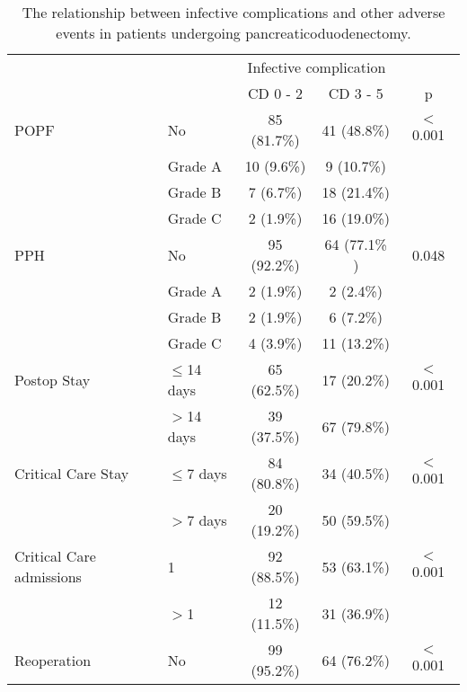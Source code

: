 \begin{table}[p]
	\centering
	\caption{The relationship between infective complications and other adverse events in patients undergoing pancreaticoduodenectomy.}
	\label{table:crp_comp_infect_vs_other_complications}
	\renewcommand{\arraystretch}{1.5} %
	\setlength{\tabcolsep}{9pt} %
	\begin{tabular}{|l l c c c|}
		\hline
		                         &               & \multicolumn{2}{c}{Infective complication} & \\
		                         &               & CD 0 - 2     & CD 3 - 5     & p              \\ \hline
		POPF                     & No            & 85 (81.7\%)  & 41 (48.8\%)  & $<$0.001       \\
		                         & Grade A       & 10 (9.6\%)   & 9 (10.7\%)   &  \\
		                         & Grade B       & 7 (6.7\%)    & 18 (21.4\%)  &  \\
		                         & Grade C       & 2 (1.9\%)    & 16 (19.0\%)  &  \\
		PPH                      & No            & 95 (92.2\%)  & 64 (77.1\% ) & 0.048          \\
		                         & Grade A       & 2 (1.9\%)    & 2 (2.4\%)    &  \\
		                         & Grade B       & 2 (1.9\%)    & 6 (7.2\%)    &  \\
		                         & Grade C       & 4  (3.9\%)   & 11 (13.2\%)  &  \\
		Postop Stay              & $\leq$14 days & 65 (62.5\%)  & 17 (20.2\%)  & $<$0.001       \\
		                         & $>$14 days    & 39 (37.5\%)  & 67 (79.8\%)  &  \\
		Critical Care Stay       & $\leq$7 days  & 84 (80.8\%)  & 34 (40.5\%)  & $<$0.001       \\
		                         & $>$7 days     & 20 (19.2\%)  & 50 (59.5\%)  &  \\
		Critical Care admissions & 1             & 92 (88.5\%)  & 53 (63.1\%)  & $<$0.001       \\
		                         & $>$1          & 12 (11.5\%)  & 31 (36.9\%)  &  \\
		Reoperation              & No            & 99 (95.2\%)  & 64 (76.2\%)  & $<$0.001       \\

\end{tabular}
\end{table}
